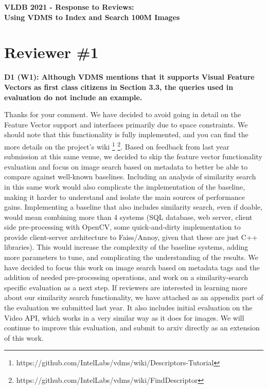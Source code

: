 \documentclass[11pt]{proposalnsf}
\begin{document}
\begin{center}
{\Large{\bf VLDB 2021 - Response to Reviews: \\
Using VDMS to Index and Search 100M Images}}

\end{center}

\newpage
\section{Reviewer \#1}

\noindent %
\textbf{
D1 (W1): Although VDMS mentions that it supports Visual Feature Vectors as
first class citizens in Section 3.3, the queries used in evaluation
do not include an example.
}\bigskip

Thanks for your comment.
We have decided to avoid going in detail on the Feature Vector support
and interfaces primarily due to space constraints.
We should note that this functionality is fully implemented,
and you can find the more details on the project's wiki
\footnote{https://github.com/IntelLabs/vdms/wiki/Descriptors-Tutorial}
\footnote{https://github.com/IntelLabs/vdms/wiki/FindDescriptor}.
Based on feedback from last year submission at this same venue, we decided
to skip the feature vector functionality evaluation and focus on image search
based on metadata to better be able to compare against well-known baselines.
Including an analysis of similarity search in this same work would also
complicate the implementation of the baseline, making it harder to understand
and isolate the main sources of performance gains.
Implementing a baseline that also includes similarity search, even if doable,
would mean combining more than 4 systems (SQL database, web server, client side
pre-processing with OpenCV, some quick-and-dirty implementation
to provide client-server architecture to Faiss/Annoy, given that these
are just C++ libraries).
This would increase the complexity of the baseline systems, adding
more parameters to tune, and complicating the understanding of the results.
We have decided to focus this work on image search based on metadata tags
and the addition of needed pre-processing operations, and
work on a similarity-search specific evaluation as a next step.
If reviewers are interested in learning more about our similarity search functionality,
we have attached as an appendix part of the evaluation we submitted last year.
It also includes initial evaluation on the Video API, which works in a very
similar way as it does for images.
We will continue to improve this evaluation, and submit to arxiv directly
as an extension of this work.
\end{document}
